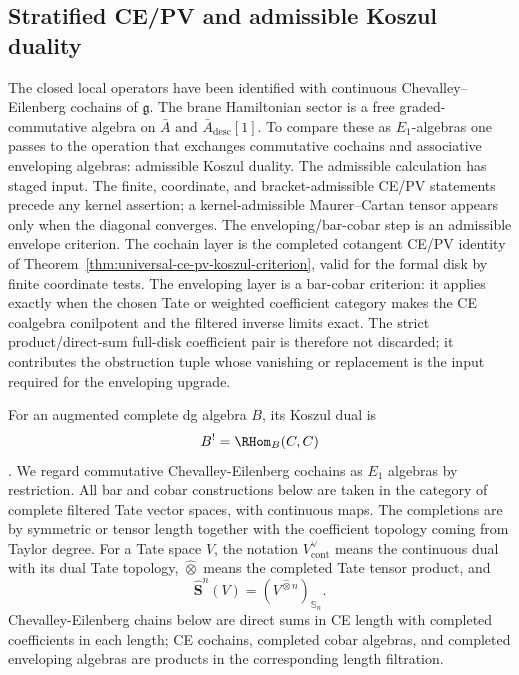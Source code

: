 \documentclass[11pt]{memoir}
\begin{document}
\subsection{Stratified CE/PV and admissible Koszul duality}

The closed local operators have been identified with continuous
Chevalley--Eilenberg cochains of $\mathfrak g$. The brane Hamiltonian
sector is a free graded-commutative algebra on $\bar A$ and $\bar
A_{\mathrm{desc}}[1]$. To compare these as $E_1$-algebras one passes to
the operation that exchanges commutative cochains and associative
enveloping algebras: admissible Koszul duality.
The admissible calculation has staged input.  The finite, coordinate, and
bracket-admissible CE/PV statements precede any kernel assertion; a
kernel-admissible Maurer--Cartan tensor appears only when the diagonal
converges.  The enveloping/bar-cobar step is an admissible envelope
criterion.  The cochain layer is the
completed cotangent CE/PV identity of
Theorem~\ref{thm:universal-ce-pv-koszul-criterion}, valid for the formal
disk by finite coordinate tests.  The enveloping layer is a bar-cobar
criterion: it applies exactly when the chosen Tate or weighted coefficient
category makes the CE coalgebra conilpotent and the filtered inverse
limits exact.  The strict product/direct-sum full-disk coefficient pair is
therefore not discarded; it contributes the obstruction tuple whose
vanishing or replacement is the input required for the enveloping
upgrade.

\begin{defn}
  For an augmented complete dg algebra $B$, its Koszul dual is
  $$B^!=\RHom_B(\C,\C)$$
  \cite{priddy}.
  We regard commutative Chevalley-Eilenberg cochains as $E_1$ algebras by
  restriction. All bar and cobar constructions below are taken in the category
  of complete filtered Tate vector spaces, with continuous maps. The
  completions are by symmetric or tensor length together with the coefficient
  topology coming from Taylor degree.
  For a Tate space $V$, the notation $V^\vee_{\mathrm{cont}}$ means the
  continuous dual with its dual Tate topology, $\widehat\otimes$ means the
  completed Tate tensor product, and
  $$\widehat{\mathbf S}^n(V)=(V^{\widehat\otimes n})_{\mathbb S_n}.$$
  Chevalley-Eilenberg chains below are direct sums in CE length with completed
  coefficients in each length; CE cochains, completed cobar algebras, and
  completed enveloping algebras are products in the corresponding length
  filtration.
\end{defn}
\end{document}
